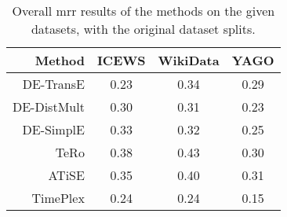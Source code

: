 \begin{table}[htb]
\centering
\begin{minipage}{\columnwidthcaption}
\centering
\caption{Overall \gls{mrr} results of the methods on the given datasets, with the original dataset splits.}
\vspace{-3mm}

\begin{tabular}{r|SSS}
\hline
Method & {ICEWS} & {WikiData} & {YAGO}\\
\hline
DE-TransE   & 0.23 & 0.34 & 0.29 \\
DE-DistMult & 0.30 & 0.31 & 0.23 \\
DE-SimplE   & 0.33 & 0.32 & 0.25 \\
TeRo        & 0.38 & 0.43 & 0.30 \\
ATiSE       & 0.35 & 0.40 & 0.31 \\
TimePlex    & 0.24 & 0.24 & 0.15 \\
\hline

\end{tabular}

\label{tab:overall_results}
\end{minipage}
\end{table}
